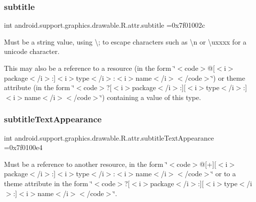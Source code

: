 \subsubsection{\texorpdfstring{subtitle}{subtitle}}
{\footnotesize\ttfamily int android.\+support.\+graphics.\+drawable.\+R.\+attr.\+subtitle =0x7f01002c\hspace{0.3cm}{\ttfamily [static]}}

Must be a string value, using \textquotesingle{}\textbackslash{};\textquotesingle{} to escape characters such as \textquotesingle{}\textbackslash{}n\textquotesingle{} or \textquotesingle{}\textbackslash{}uxxxx\textquotesingle{} for a unicode character. 

This may also be a reference to a resource (in the form \char`\"{}$<$code$>$@\mbox{[}$<$i$>$package$<$/i$>$\+:\mbox{]}$<$i$>$type$<$/i$>$\+:$<$i$>$name$<$/i$>$$<$/code$>$\char`\"{}) or theme attribute (in the form \char`\"{}$<$code$>$?\mbox{[}$<$i$>$package$<$/i$>$\+:\mbox{]}\mbox{[}$<$i$>$type$<$/i$>$\+:\mbox{]}$<$i$>$name$<$/i$>$$<$/code$>$\char`\"{}) containing a value of this type. \mbox{\label{classandroid_1_1support_1_1graphics_1_1drawable_1_1R_1_1attr_aaca2519d000a48ad7a1a510388e73ea3}} 
\subsubsection{\texorpdfstring{subtitle\+Text\+Appearance}{subtitleTextAppearance}}
{\footnotesize\ttfamily int android.\+support.\+graphics.\+drawable.\+R.\+attr.\+subtitle\+Text\+Appearance =0x7f0100e4\hspace{0.3cm}{\ttfamily [static]}}

Must be a reference to another resource, in the form \char`\"{}$<$code$>$@\mbox{[}+\mbox{]}\mbox{[}$<$i$>$package$<$/i$>$\+:\mbox{]}$<$i$>$type$<$/i$>$\+:$<$i$>$name$<$/i$>$$<$/code$>$\char`\"{} or to a theme attribute in the form \char`\"{}$<$code$>$?\mbox{[}$<$i$>$package$<$/i$>$\+:\mbox{]}\mbox{[}$<$i$>$type$<$/i$>$\+:\mbox{]}$<$i$>$name$<$/i$>$$<$/code$>$\char`\"{}. \mbox{\label{classandroid_1_1support_1_1graphics_1_1drawable_1_1R_1_1attr_a8f14fb74741e1aed62820e6a44ee49d7}} 
